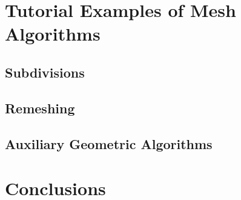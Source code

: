 \documentclass{egpubl}
\begin{document}
\section{Tutorial Examples of Mesh Algorithms}

  \subsection{Subdivisions}
  

  \subsection{Remeshing}
  

  \subsection{Auxiliary Geometric Algorithms}
  

\section{Conclusions}


{\small


}
\end{document}
